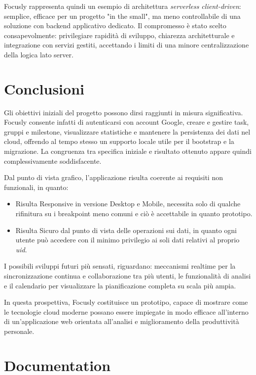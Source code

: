 \documentclass[11pt,a4paper]{article}
\begin{document}
\par Focusly rappresenta quindi un esempio di architettura \emph{serverless client-driven}: semplice, efficace per un progetto "in the small", ma meno controllabile di una soluzione con backend applicativo dedicato. Il compromesso è stato scelto consapevolmente: privilegiare rapidità di sviluppo, chiarezza architetturale e integrazione con servizi gestiti, accettando i limiti di una minore centralizzazione della logica lato server.

\section{Conclusioni}
\par Gli obiettivi iniziali del progetto possono dirsi raggiunti in misura significativa. Focusly consente infatti di autenticarsi con account Google, creare e gestire task, gruppi e milestone, visualizzare statistiche e mantenere la persistenza dei dati nel cloud, offrendo al tempo stesso un supporto locale utile per il bootstrap e la migrazione. La congruenza tra specifica iniziale e risultato ottenuto appare quindi complessivamente soddisfacente.

\par Dal punto di vista grafico, l'applicazione risulta coerente ai requisiti non funzionali, in quanto:
  \begin{itemize}
    \item Risulta Responsive in versione Desktop e Mobile, necessita solo di qualche rifinitura su i breakpoint meno comuni e ciò è accettabile in quanto prototipo. 
    \item Risulta Sicuro dal punto di vista delle operazioni sui dati, in quanto ogni utente può accedere con il minimo privilegio ai soli dati relativi al proprio \textit{uid}.
  \end{itemize}

\par I possibili sviluppi futuri più sensati, riguardano: meccanismi realtime per la sincronizzazione continua e collaborazione tra più utenti, le funzionalità di analisi e il calendario per visualizzare la pianificazione completa su scala più ampia.
\par In questa prospettiva, Focusly costituisce un prototipo, capace di mostrare come le tecnologie cloud moderne possano essere impiegate in modo efficace all'interno di un'applicazione web orientata all'analisi e miglioramento della produttività personale.

\section{Documentation}
\end{document}
